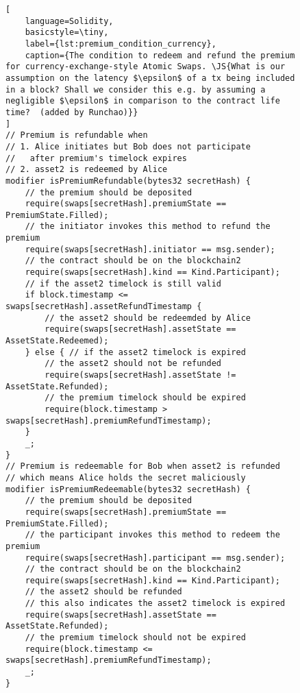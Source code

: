 \begin{figure}[htb]
\begin{lstlisting}[
    language=Solidity, 
    basicstyle=\tiny,
    label={lst:premium_condition_currency},
    caption={The condition to redeem and refund the premium for currency-exchange-style Atomic Swaps. \JS{What is our assumption on the latency $\epsilon$ of a tx being included in a block? Shall we consider this e.g. by assuming a negligible $\epsilon$ in comparison to the contract life time?  (added by Runchao)}}
]
// Premium is refundable when
// 1. Alice initiates but Bob does not participate
//   after premium's timelock expires
// 2. asset2 is redeemed by Alice
modifier isPremiumRefundable(bytes32 secretHash) {
    // the premium should be deposited
    require(swaps[secretHash].premiumState == PremiumState.Filled);
    // the initiator invokes this method to refund the premium
    require(swaps[secretHash].initiator == msg.sender);
    // the contract should be on the blockchain2
    require(swaps[secretHash].kind == Kind.Participant);
    // if the asset2 timelock is still valid
    if block.timestamp <= swaps[secretHash].assetRefundTimestamp {
        // the asset2 should be redeemded by Alice
        require(swaps[secretHash].assetState == AssetState.Redeemed);
    } else { // if the asset2 timelock is expired
        // the asset2 should not be refunded
        require(swaps[secretHash].assetState != AssetState.Refunded);
        // the premium timelock should be expired
        require(block.timestamp > swaps[secretHash].premiumRefundTimestamp);
    }
    _;
}
// Premium is redeemable for Bob when asset2 is refunded
// which means Alice holds the secret maliciously
modifier isPremiumRedeemable(bytes32 secretHash) {
    // the premium should be deposited
    require(swaps[secretHash].premiumState == PremiumState.Filled);
    // the participant invokes this method to redeem the premium
    require(swaps[secretHash].participant == msg.sender);
    // the contract should be on the blockchain2
    require(swaps[secretHash].kind == Kind.Participant);
    // the asset2 should be refunded
    // this also indicates the asset2 timelock is expired
    require(swaps[secretHash].assetState == AssetState.Refunded);
    // the premium timelock should not be expired
    require(block.timestamp <= swaps[secretHash].premiumRefundTimestamp);
    _;
}
\end{lstlisting}
\end{figure}

